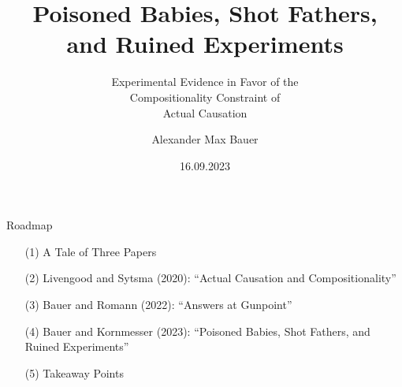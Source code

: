 \documentclass[xcolor=table,9pt,aspectratio=169]{beamer}
\title{Poisoned Babies, Shot Fathers,\\and Ruined Experiments}
\subtitle{Experimental Evidence in Favor of the\\Compositionality Constraint of\\Actual Causation}
\author{Alexander Max Bauer}
\date{16.09.2023}
\begin{document}
{
\begin{frame}
   \maketitle
\end{frame}
}


\begin{frame}{\vspace*{10mm}Roadmap}
\vspace*{-5mm}
\begin{itemize}
   \item[(1)] A Tale of Three Papers
   \item[(2)] Livengood and Sytsma (2020): ``Actual Causation and Compositionality''
   \item[(3)] Bauer and Romann (2022): ``Answers at Gunpoint''
   \item[(4)] Bauer and Kornmesser (2023): ``Poisoned Babies, Shot Fathers, and Ruined Experiments''
   \item[(5)] Takeaway Points
\end{itemize}
\end{frame}
\end{document}

